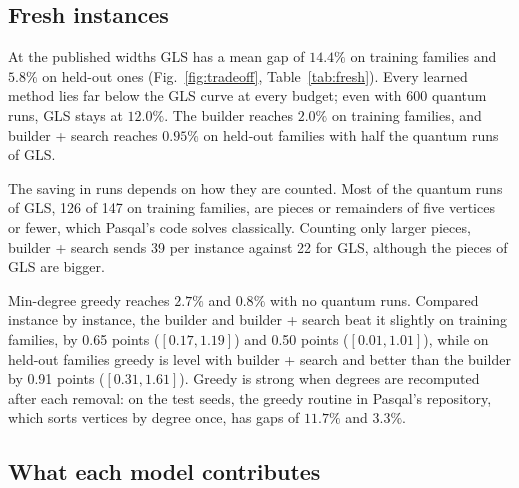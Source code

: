 \documentclass[10pt,pra,aps,twocolumn,superscriptaddress,floatfix,nofootinbib]{revtex4-2}
\newcommand{\GLS}{GLS}
\begin{document}
\subsection{Fresh instances}

At the published widths \GLS{} has a mean gap of $14.4\%$ on training families and $5.8\%$ on held-out ones (Fig.~\ref{fig:tradeoff}, Table~\ref{tab:fresh}). Every learned method lies far below the \GLS{} curve at every budget; even with 600 quantum runs, \GLS{} stays at $12.0\%$. The builder reaches $2.0\%$ on training families, and builder + search reaches $0.95\%$ on held-out families with half the quantum runs of \GLS{}.

The saving in runs depends on how they are counted. Most of the quantum runs of \GLS{}, 126 of 147 on training families, are pieces or remainders of five vertices or fewer, which Pasqal's code solves classically. Counting only larger pieces, builder + search sends 39 per instance against 22 for \GLS{}, although the pieces of \GLS{} are bigger.

Min-degree greedy reaches $2.7\%$ and $0.8\%$ with no quantum runs. Compared instance by instance, the builder and builder + search beat it slightly on training families, by 0.65 points ($[0.17, 1.19]$) and 0.50 points ($[0.01, 1.01]$), while on held-out families greedy is level with builder + search and better than the builder by 0.91 points ($[0.31, 1.61]$). Greedy is strong when degrees are recomputed after each removal: on the test seeds, the greedy routine in Pasqal's repository, which sorts vertices by degree once, has gaps of $11.7\%$ and $3.3\%$.

\subsection{What each model contributes}
\end{document}
